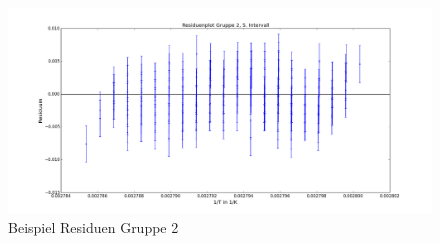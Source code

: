 \documentclass[12pt,a4paper]{article}
\begin{document}
\begin{figure}[H]
\centering
\includegraphics[scale=0.4]{G2_Intervall5_Residuen.png}
\caption{Beispiel Residuen Gruppe 2}
\end{figure}
\end{document}

